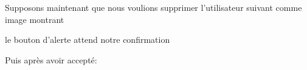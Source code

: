 \documentclass{article}
\begin{document}
\begin{enumerate}
  
  
  Supposons maintenant que nous voulions supprimer l'utilisateur suivant comme image montrant
  
  \vspace{0.7cm}
              \hspace*{-0.7in}
               \noindent{}
  
  le bouton d'alerte attend notre confirmation
  
\vspace{0.7cm}
               \hspace*{-0.7in}

               \noindent{}  
  
  \vspace{2cm}
  Puis après avoir accepté:
  

\end{enumerate}
\end{document}

